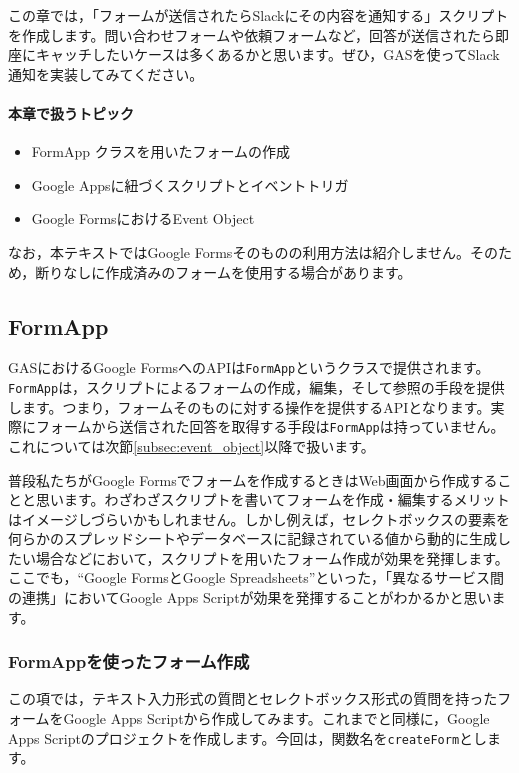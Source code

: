 \documentclass[uplatex,a4j]{jsarticle}
\begin{document}
この章では，「フォームが送信されたらSlackにその内容を通知する」スクリプトを作成します。問い合わせフォームや依頼フォームなど，回答が送信されたら即座にキャッチしたいケースは多くあるかと思います。ぜひ，GASを使ってSlack通知を実装してみてください。

\paragraph{本章で扱うトピック}
\begin{itemize}
\item FormApp クラスを用いたフォームの作成
\item Google Appsに紐づくスクリプトとイベントトリガ
\item Google FormsにおけるEvent Object
\end{itemize}

なお，本テキストではGoogle Formsそのものの利用方法は紹介しません。そのため，断りなしに作成済みのフォームを使用する場合があります。

\subsection{FormApp}

GASにおけるGoogle FormsへのAPIは\verb|FormApp|というクラスで提供されます。\verb|FormApp|は，スクリプトによるフォームの作成，編集，そして参照の手段を提供します。つまり，フォームそのものに対する操作を提供するAPIとなります。実際にフォームから送信された回答を取得する手段は\verb|FormApp|は持っていません。これについては次節\ref{subsec:event_object}以降で扱います。

普段私たちがGoogle Formsでフォームを作成するときはWeb画面から作成することと思います。わざわざスクリプトを書いてフォームを作成・編集するメリットはイメージしづらいかもしれません。しかし例えば，セレクトボックスの要素を何らかのスプレッドシートやデータベースに記録されている値から動的に生成したい場合などにおいて，スクリプトを用いたフォーム作成が効果を発揮します。ここでも，``Google FormsとGoogle Spreadsheets''といった，「異なるサービス間の連携」においてGoogle Apps Scriptが効果を発揮することがわかるかと思います。

\subsubsection{FormAppを使ったフォーム作成}

この項では，テキスト入力形式の質問とセレクトボックス形式の質問を持ったフォームをGoogle Apps Scriptから作成してみます。これまでと同様に，Google Apps Scriptのプロジェクトを作成します。今回は，関数名を\verb|createForm|とします。
\end{document}
